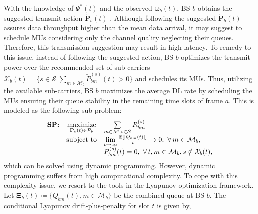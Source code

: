 \documentclass[conference]{IEEEtran}
\begin{document}
With the knowledge of $\Psi^{*}(t)$ and the observed $\boldsymbol{\omega}_b(t)$, BS $b$ obtains the suggested transmit action $\check{\mathbf{P}}_b(t)$ \cite{Neely:13:Arxiv}. Although following the suggested $\check{\mathbf{P}}_b(t)$ assures data throughput higher than the mean data arrival, it may suggest to schedule MUs considering only the channel quality neglecting their queues. Therefore, this transmission suggestion may result in high latency. To remedy to this issue, instead of following the suggested action, BS $b$ optimizes the transmit power over the recommended set of sub-carriers  $\mathcal{X}_b(t)=\{s\in\mathcal{S}|\sum_{m\in\mathcal{M}_b}\check{P}_{bm}^{(s)}(t)> 0\}$ and schedules its MUs.
%
%
%
Thus, utilizing the available sub-carriers, BS $b$ maximizes the average DL rate by scheduling the MUs ensuring their queue stability in the remaining time slots of frame $a$. This is modeled as the following sub-problem:
%
$$\begin{array}{ccl}
{\mbox{\bf SP:}}&\underset{\mathbf{P}_b(t)\in\mathcal{P}_b}{\text{maximize}} & \textstyle\sum\limits_{m\in\mathcal{M},s\in\mathcal{S}}\bar{R}_{bm}^{(s)}
%
\\ &\mbox{subject to}& \textstyle\lim\limits_{t\to\infty}\frac{\mathbb{E}\left[|Q_{bm}(t)|\right]}{t}\to 0, ~\forall\,m\in\mathcal{M}_b,
%
\\&& P_{bm}^{(s)}(t)=0, ~\forall\,t,m\in\mathcal{M}_b,s\notin\mathcal{X}_b(t),
\end{array}$$
%
%
%
%
which  can be solved using dynamic programming. However, dynamic programming suffers from high computational complexity. To cope with this complexity issue, we resort to the tools in the Lyapunov optimization framework.
%
%
%
%
Let $\mathbf{\Xi}_b(t)\coloneqq\{Q_{bm}(t),m\in\mathcal{M}_b\}$ be the combined queue at BS $b$.  The conditional Lyapunov drift-plus-penalty for slot $t$ is given by,%
\end{document}
